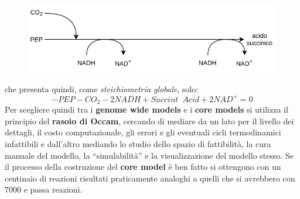 \documentclass[a4paper,12pt, oneside]{book}
\begin{document}
\begin{figure}[H]
  \centering
  \includegraphics[scale = 0.85]{img/lr2.pdf}
\end{figure}
che presenta quindi, come \textit{steichiometria globale}, solo:
\[-PEP-CO_2-2NADH+Succint\,\,\,Acid+2NAD^{+}=0\]
Per scegliere quindi tra i \textbf{genome wide models} e i \textbf{core models}
si utilizza il principio del \textbf{rasoio di Occam}, cercando di mediare da un
lato per il livello dei dettagli, il costo computazionale, gli errori e gli
eventuali cicli termodinamici infattibili e dall'altro mediando lo studio dello
spazio di fattibilità, la cura manuale del modello, la ``simulabilità'' e la
visualizzazione del modello stesso. Se il processo della costruzione del
\textbf{core model} è ben fatto si ottengono con un centinaio di reazioni
risultati praticamente analoghi a quelli che si avrebbero con 7000 e passa
reazioni.
\end{document}
